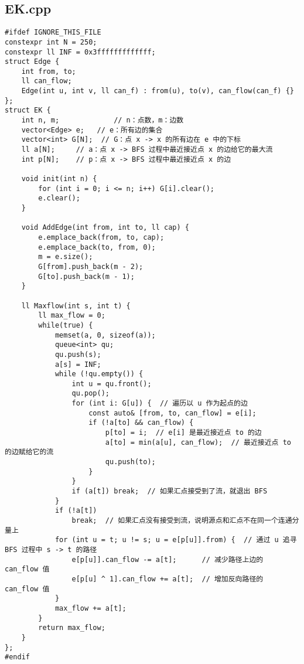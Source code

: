 \documentclass[UTF8, a4paper, titlepage, twoside]{ctexart}
\begin{document}
\subsection{EK.cpp}
\begin{verbatim}
#ifdef IGNORE_THIS_FILE
constexpr int N = 250;
constexpr ll INF = 0x3fffffffffffff;
struct Edge {
    int from, to;
    ll can_flow;   
    Edge(int u, int v, ll can_f) : from(u), to(v), can_flow(can_f) {}
};
struct EK {
    int n, m;             // n：点数，m：边数
    vector<Edge> e;   // e：所有边的集合
    vector<int> G[N];  // G：点 x -> x 的所有边在 e 中的下标
    ll a[N];     // a：点 x -> BFS 过程中最近接近点 x 的边给它的最大流
    int p[N];    // p：点 x -> BFS 过程中最近接近点 x 的边

    void init(int n) {
        for (int i = 0; i <= n; i++) G[i].clear();
        e.clear();
    }

    void AddEdge(int from, int to, ll cap) {
        e.emplace_back(from, to, cap);
        e.emplace_back(to, from, 0);
        m = e.size();
        G[from].push_back(m - 2);
        G[to].push_back(m - 1);
    }

    ll Maxflow(int s, int t) {
        ll max_flow = 0;
        while(true) {
            memset(a, 0, sizeof(a));
            queue<int> qu;
            qu.push(s);
            a[s] = INF;
            while (!qu.empty()) {
                int u = qu.front();
                qu.pop();
                for (int i: G[u]) {  // 遍历以 u 作为起点的边
                    const auto& [from, to, can_flow] = e[i];
                    if (!a[to] && can_flow) {
                        p[to] = i;  // e[i] 是最近接近点 to 的边
                        a[to] = min(a[u], can_flow);  // 最近接近点 to 的边赋给它的流
                        qu.push(to);
                    }
                }
                if (a[t]) break;  // 如果汇点接受到了流，就退出 BFS
            }
            if (!a[t])
                break;  // 如果汇点没有接受到流，说明源点和汇点不在同一个连通分量上
            for (int u = t; u != s; u = e[p[u]].from) {  // 通过 u 追寻 BFS 过程中 s -> t 的路径
                e[p[u]].can_flow -= a[t];      // 减少路径上边的 can_flow 值
                e[p[u] ^ 1].can_flow += a[t];  // 增加反向路径的 can_flow 值
            }
            max_flow += a[t];
        }
        return max_flow;
    }
};
#endif
\end{verbatim}
\end{document}
